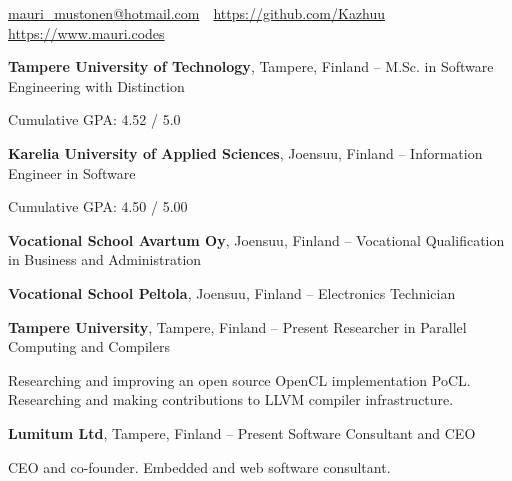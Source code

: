 \documentclass[letterpaper,MMMyyyy,nonstopmode]{simpleresumecv}
\newcommand{\CVAuthor}{Mauri Mustonen}
\newcommand{\CVWebpage}{https://www.mauri.codes}
\begin{document}

\Title{\CVAuthor}

\begin{SubTitle}
    \par
    \href{mailto:mauri\_mustonen@hotmail.com}{mauri\_mustonen@hotmail.com}\,
    \SubBulletSymbol\,
    \href{https://github.com/Kazhuu}{https://github.com/Kazhuu}\,
    \SubBulletSymbol\,
    \href{\CVWebpage}{\url{\CVWebpage}}
\end{SubTitle}

\begin{Body}



\Entry
\textbf{Tampere University of Technology}, Tampere, Finland
\hfill
{} -- 
\Gap
\BulletItem
M.Sc. in Software Engineering with Distinction
\begin{Detail}
    \SubBulletItem Cumulative GPA: 4.52 / 5.0
\end{Detail}

\BigGap
\Entry
\textbf{Karelia University of Applied Sciences}, Joensuu, Finland
\hfill
{} -- 
\Gap
\BulletItem
Information Engineer in Software
\begin{Detail}
    \SubBulletItem Cumulative GPA: 4.50 / 5.00
\end{Detail}

\BigGap
\Entry
\textbf{Vocational School Avartum Oy}, Joensuu, Finland
\hfill
{} -- 
\Gap
\BulletItem
Vocational Qualification in Business and Administration

\BigGap
\Entry
\textbf{Vocational School Peltola}, Joensuu, Finland
\hfill
{} -- 
\Gap
\BulletItem
Electronics Technician



\Entry
\textbf{Tampere University}, Tampere, Finland
\hfill
{} -- Present
\Gap
\BulletItem Researcher in Parallel Computing and Compilers
\begin{Detail}
    \SubBulletItem Researching and improving an open source OpenCL
    implementation PoCL.
    \SubBulletItem Researching and making contributions to LLVM compiler
    infrastructure.
\end{Detail}

\BigGap
\Entry
\textbf{Lumitum Ltd}, Tampere, Finland
\hfill
{} -- Present
\Gap
\BulletItem Software Consultant and CEO
\begin{Detail}
    \SubBulletItem CEO and co-founder.
    \SubBulletItem Embedded and web software consultant.
\end{Detail}


\end{Body}
\end{document}
